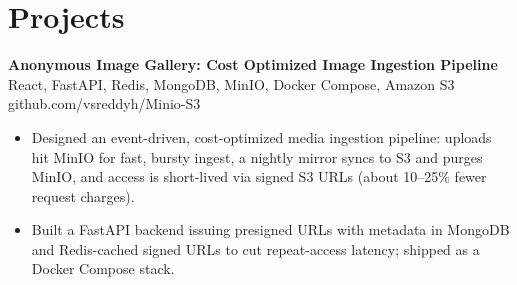 \documentclass[a4paper,11pt]{article}
\newcommand{\resumeItem}[1]{\item \small{#1}}
\newcommand{\resumeSubheading}[4]{%
  \textbf{#1} \hfill \textbf{#2} \\
{#3} \hfill {#4}
}
\newcommand{\resumeSubHeadingListStart}{\begin{itemize}}
\newcommand{\resumeSubHeadingListEnd}{\end{itemize}}
\begin{document}
\section*{Projects}


\resumeSubheading
{Anonymous Image Gallery: Cost Optimized Image Ingestion Pipeline}{}{React, FastAPI, Redis, MongoDB, MinIO, Docker Compose, Amazon S3}{github.com/vsreddyh/Minio-S3}
\resumeSubHeadingListStart
\resumeItem{Designed an event-driven, cost-optimized media ingestion pipeline: uploads hit MinIO for fast, bursty ingest, a nightly mirror syncs to S3 and purges MinIO, and access is short-lived via signed S3 URLs (about 10--25\% fewer request charges).}
\resumeItem{Built a FastAPI backend issuing presigned URLs with metadata in MongoDB and Redis-cached signed URLs to cut repeat-access latency; shipped as a Docker Compose stack.}
\resumeSubHeadingListEnd

\vspace{-0.6em}
\end{document}
